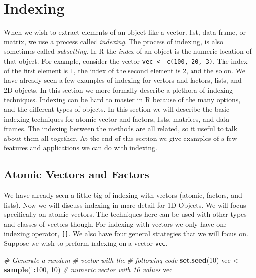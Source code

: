 \documentclass[
]{book}
\newenvironment{Shaded}{\begin{snugshade}}{\end{snugshade}}
\newcommand{\CommentTok}[1]{\textcolor[rgb]{0.56,0.35,0.01}{\textit{#1}}}
\newcommand{\DecValTok}[1]{\textcolor[rgb]{0.00,0.00,0.81}{#1}}
\newcommand{\KeywordTok}[1]{\textcolor[rgb]{0.13,0.29,0.53}{\textbf{#1}}}
\newcommand{\NormalTok}[1]{#1}
\newcommand{\OperatorTok}[1]{\textcolor[rgb]{0.81,0.36,0.00}{\textbf{#1}}}
\newcommand{\StringTok}[1]{\textcolor[rgb]{0.31,0.60,0.02}{#1}}
\begin{document}
\hypertarget{indexing}{%
\chapter{Indexing}\label{indexing}}

When we wish to extract elements of an object like a vector, list, data frame, or matrix, we use a process called \emph{indexing}. The process of indexing, is also sometimes called \emph{subsetting}. In R the \emph{index} of an object is the numeric location of that object. For example, consider the vector \texttt{vec\ \textless{}-\ c(100,\ 20,\ 3)}. The index of the first element is 1, the index of the second element is 2, and the so on. We have already seen a few examples of indexing for vectors and factors, lists, and 2D objects. In this section we more formally describe a plethora of indexing techniques. Indexing can be hard to master in R because of the many options, and the different types of objects. In this section we will describe the basic indexing techniques for atomic vector and factors, lists, matrices, and data frames. The indexing between the methods are all related, so it useful to talk about them all together. At the end of this section we give examples of a few features and applications we can do with indexing.

\hypertarget{VectorIndex}{%
\section{Atomic Vectors and Factors}\label{VectorIndex}}

We have already seen a little big of indexing with vectors (atomic, factors, and lists). Now we will discuss indexing in more detail for 1D Objects. We will focus specifically on atomic vectors. The techniques here can be used with other types and classes of vectors though. For indexing with vectors we only have one indexing operator, \texttt{{[}{]}}. We also have four general strategies that we will focus on. Suppose we wish to preform indexing on a vector \texttt{vec}.

\begin{Shaded}
\begin{Highlighting}[]
\CommentTok{# Generate a random}
\CommentTok{# vector with the}
\CommentTok{# following code}
\KeywordTok{set.seed}\NormalTok{(}\DecValTok{10}\NormalTok{)}
\NormalTok{vec <-}\StringTok{ }\KeywordTok{sample}\NormalTok{(}\DecValTok{1}\OperatorTok{:}\DecValTok{100}\NormalTok{,}
    \DecValTok{10}\NormalTok{)  }\CommentTok{# numeric vector with 10 values}
\NormalTok{vec}
\end{Highlighting}
\end{Shaded}
\end{document}
